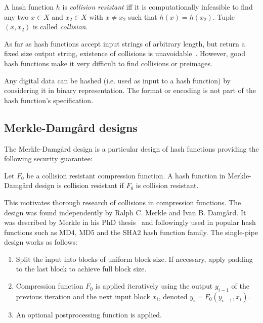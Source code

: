 \begin{defi}
  A hash function $h$ is \emph{collision resistant} iff it is computationally infeasible to
  find any two $x \in X$ and $x_2 \in X$ with $x \neq x_2$ such that $h(x) = h(x_2)$.
  Tuple $(x, x_2)$ is called \emph{collision}.
\end{defi}

As far as hash functions accept input strings of arbitrary length, but return a fixed
size output string, existence of collisions is unavoidable~\cite{schlaffer}.
However, good hash functions make it very difficult to find collisions or preimages.

Any digital data can be hashed (i.e. used as input to a hash function) by considering
it in binary representation. The format or encoding is not part of the hash function's
specification.

\subsection{Merkle-Damg\aa{}rd designs}
\label{sec:hash-md}
%
The Merkle-Damg\aa{}rd design is a particular design of hash functions providing the
following security guarantee:

\begin{defi}
  Let $F_0$ be a collision resistant compression function.
  A hash function in Merkle-Damg\aa{}rd design is collision resistant if $F_0$ is collision resistant.
\end{defi}

This motivates thorough research of collisions in compression functions.
The design was found independently by Ralph C. Merkle and Ivan B. Damg\aa{}rd.
It was described by Merkle in his PhD thesis~\cite[p. 13--15]{merkle1979secrecy}
and followingly used in popular hash functions such as MD4, MD5 and the SHA2 hash function family.
The single-pipe design works as follows:
\begin{enumerate}\itemsep0pt
\item Split the input into blocks of uniform block size.
  If necessary, apply padding to the last block to achieve full block size.
\item Compression function $F_0$ is applied iteratively using the output $y_{i-1}$ of
  the previous iteration and the next input block $x_i$, denoted $y_i = F_0(y_{i-1}, x_i)$.
\item An optional postprocessing function is applied.
\end{enumerate}

